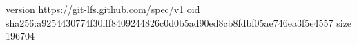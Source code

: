 version https://git-lfs.github.com/spec/v1
oid sha256:a9254430774f30fff8409244826c0d0b5ad90ed8cb8fdbf05ae746ea3f5e4557
size 196704
